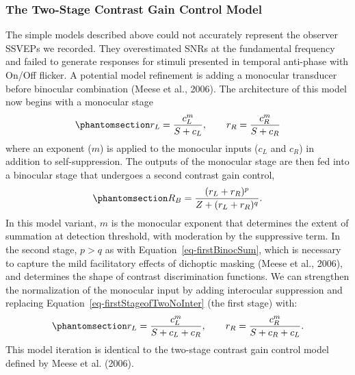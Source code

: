 \documentclass[
  12pt,
]{article}
\begin{document}
\subsubsection{The Two-Stage Contrast Gain Control
Model}\label{the-two-stage-contrast-gain-control-model}

The simple models described above could not accurately represent the
observer SSVEPs we recorded. They overestimated SNRs at the fundamental
frequency and failed to generate responses for stimuli presented in
temporal anti-phase with On/Off flicker. A potential model refinement is
adding a monocular transducer before binocular combination (Meese et
al., 2006). The architecture of this model now begins with a monocular
stage \begin{equation}\phantomsection\label{eq-firstStageofTwoNoInter}{
r_L = \frac{c_L^m}{S + c_L}, \qquad r_R = \frac{c_R^m}{S + c_R}
}\end{equation} where an exponent (\(m\)) is applied to the monocular
inputs (\(c_L\) and \(c_R\)) in addition to self-suppression. The
outputs of the monocular stage are then fed into a binocular stage that
undergoes a second contrast gain control,
\begin{equation}\phantomsection\label{eq-binocComb}{
R_{B} = \frac{(r_L+r_R)^p}{Z+(r_L+r_R)^q}.
}\end{equation} In this model variant, \(m\) is the monocular exponent
that determines the extent of summation at detection threshold, with
moderation by the suppressive term. In the second stage, \(p > q\) as
with Equation~\ref{eq-firstBinocSum}, which is necessary to capture the
mild facilitatory effects of dichoptic masking (Meese et al., 2006), and
determines the shape of contrast discrimination functions. We can
strengthen the normalization of the monocular input by adding
interocular suppression and replacing
Equation~\ref{eq-firstStageofTwoNoInter} (the first stage) with:
\begin{equation}\phantomsection\label{eq-firstStageofTwo}{
r_{L} = \frac{c_L^m}{S + c_L + c_R}, \qquad r_R = \frac{c_R^m}{S + c_R + c_L}.
}\end{equation} This model iteration is identical to the two-stage
contrast gain control model defined by Meese et al. (2006).
\end{document}
